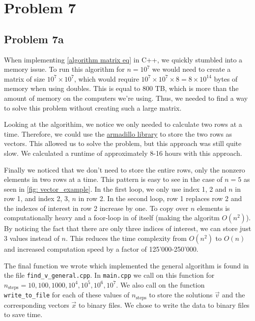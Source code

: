 \documentclass[english,notitlepage]{revtex4-1}  %
\begin{document}
\section*{Problem 7}
\subsection*{Problem 7a}
When implementing \cref{algorithm matrix eq} in C++, we quickly stumbled into a memory issue. To run this algorithm for $n=10^7$ we would need to create a matrix of size $10^7 \times 10^7$, which would require $10^7 \times 10^7 \times 8 = 8 × 10^{14}$ bytes of memory when using doubles. This is equal to 800 TB, which is more than the amount of memory on the computers we're using. Thus, we needed to find a way to solve this problem without creating such a large matrix. 

Looking at the algorithim, we notice we only needed to calculate two rows at a time. Therefore, we could use the \href{https://arma.sourceforge.net/docs.html}{armadillo library} to store the two rows as vectors. This allowed us to solve the problem, but this approach was still quite slow. We calculated a runtime of approximately 8-16 hours with this approach. 

Finally we noticed that we don't need to store the entire rows, only the nonzero elements in two rows at a time. This pattern is easy to see in the case of $n=5$ as seen in \cref{fig: vector_example}. In the first loop, we only use index 1, 2 and $n$ in row 1, and index 2, 3, $n$ in row 2. In the second loop, row 1 replaces row 2 and the indexes of interest in row 2 increase by one. To copy over $n$ elements is computationally heavy and a foor-loop in of itself (making the algoritm $O(n^2)$). By noticing the fact that there are only three indices of interest, we can store just 3 values instead of $n$. This reduces the time complexity from $O(n^2)$ to $O(n)$ and increased computation speed by a factor of 125'000-250'000.

The final function we wrote which implemented the general algorithm is found in the file \verb|find_v_general.cpp|. In \verb|main.cpp| we call on this function for $n_\text{steps} = 10, 100, 1000, 10^4, 10^5, 10^6, 10^7$. We also call on the function \verb|write_to_file| for each of these values of $n_\text{steps}$ to store the solutions $\vec{v}$ and the corresponding vectors $\vec{x}$ to binary files. We chose to write the data to binary files to save time.
\end{document}
